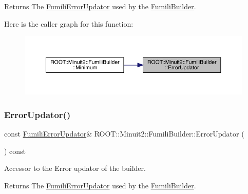 \begin{DoxyReturn}{Returns}
The \mbox{\hyperlink{classROOT_1_1Minuit2_1_1FumiliErrorUpdator}{Fumili\+Error\+Updator}} used by the \mbox{\hyperlink{classROOT_1_1Minuit2_1_1FumiliBuilder}{Fumili\+Builder}}. 
\end{DoxyReturn}
Here is the caller graph for this function\+:
\nopagebreak
\begin{figure}[H]
\begin{center}
\leavevmode
\includegraphics[width=350pt]{dc/dcb/classROOT_1_1Minuit2_1_1FumiliBuilder_a03face0b120b333aea0b49d5531518ef_icgraph}
\end{center}
\end{figure}
\mbox{\label{classROOT_1_1Minuit2_1_1FumiliBuilder_a03face0b120b333aea0b49d5531518ef}} 
\subsubsection{\texorpdfstring{ErrorUpdator()}{ErrorUpdator()}\hspace{0.1cm}{\footnotesize\ttfamily [2/3]}}
{\footnotesize\ttfamily const \mbox{\hyperlink{classROOT_1_1Minuit2_1_1FumiliErrorUpdator}{Fumili\+Error\+Updator}}\& R\+O\+O\+T\+::\+Minuit2\+::\+Fumili\+Builder\+::\+Error\+Updator (\begin{DoxyParamCaption}{ }\end{DoxyParamCaption}) const\hspace{0.3cm}{\ttfamily [inline]}}

Accessor to the Error updator of the builder.

\begin{DoxyReturn}{Returns}
The \mbox{\hyperlink{classROOT_1_1Minuit2_1_1FumiliErrorUpdator}{Fumili\+Error\+Updator}} used by the \mbox{\hyperlink{classROOT_1_1Minuit2_1_1FumiliBuilder}{Fumili\+Builder}}. 
\end{DoxyReturn}
\mbox{\label{classROOT_1_1Minuit2_1_1FumiliBuilder_a03face0b120b333aea0b49d5531518ef}} 
